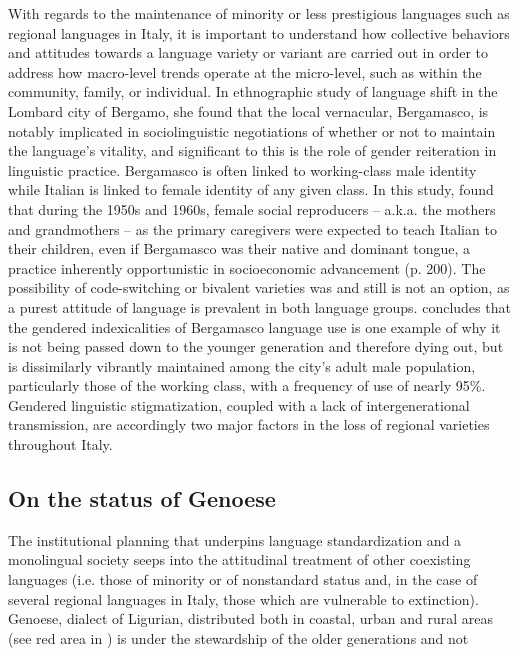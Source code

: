 \documentclass[output=paper,colorlinks,citecolor=brown]{langscibook}
\begin{document}
\par With regards to the maintenance of minority or less prestigious languages such as regional languages in Italy, it is important to understand how collective behaviors and attitudes towards a language variety or variant are carried out in order to address how macro-level trends operate at the micro-level, such as within the community, family, or individual. In \cite{cava06} ethnographic study of language shift in the Lombard city of Bergamo, she found that the local vernacular, Bergamasco, is notably implicated in sociolinguistic negotiations of whether or not to maintain the language’s vitality, and significant to this is the role of gender reiteration in linguistic practice. Bergamasco is often linked to working-class male identity while Italian is linked to female identity of any given class. In this study, \citeauthor{cava06} found that during the 1950s and 1960s, female social reproducers – a.k.a. the mothers and grandmothers – as the primary caregivers were expected to teach Italian to their children, even if Bergamasco was their native and dominant tongue, a practice inherently opportunistic in socioeconomic advancement (p. 200). The possibility of code-switching or bivalent varieties \citep{wool98} was and still is not an option, as a purest attitude of language is prevalent in both language groups. \cite{cava06} concludes that the gendered indexicalities of Bergamasco language use is one example of why it is not being passed down to the younger generation and therefore dying out, but is dissimilarly vibrantly maintained among the city’s adult male population, particularly those of the working class, with a frequency of use of nearly 95\%. Gendered linguistic stigmatization, coupled with a lack of intergenerational transmission, are accordingly two major factors in the loss of regional varieties throughout Italy.

\subsection{On the status of Genoese}
\par The institutional planning that underpins language standardization and a monolingual society seeps into the attitudinal treatment of other coexisting languages (i.e. those of minority or of nonstandard status and, in the case of several regional languages in Italy, those which are vulnerable to extinction). Genoese, dialect of Ligurian, distributed both in coastal, urban and rural areas (see red area in ) is under the stewardship of the older generations and not 
\end{document}
